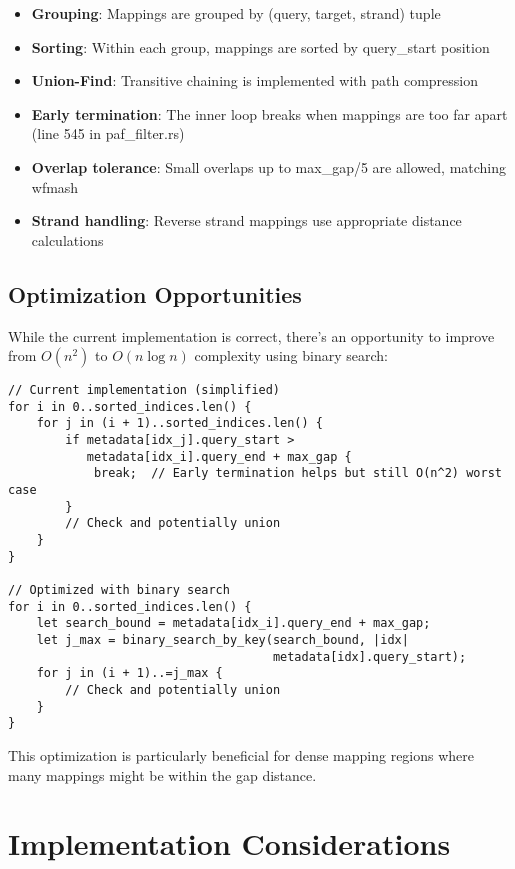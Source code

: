 \documentclass[11pt]{article}
\begin{document}
\begin{itemize}
    \item \textbf{Grouping}: Mappings are grouped by (query, target, strand) tuple
    \item \textbf{Sorting}: Within each group, mappings are sorted by query\_start position
    \item \textbf{Union-Find}: Transitive chaining is implemented with path compression
    \item \textbf{Early termination}: The inner loop breaks when mappings are too far apart (line 545 in paf\_filter.rs)
    \item \textbf{Overlap tolerance}: Small overlaps up to max\_gap/5 are allowed, matching wfmash
    \item \textbf{Strand handling}: Reverse strand mappings use appropriate distance calculations
\end{itemize}

\subsection{Optimization Opportunities}

While the current implementation is correct, there's an opportunity to improve from $O(n^2)$ to $O(n \log n)$ complexity using binary search:

\begin{verbatim}
// Current implementation (simplified)
for i in 0..sorted_indices.len() {
    for j in (i + 1)..sorted_indices.len() {
        if metadata[idx_j].query_start >
           metadata[idx_i].query_end + max_gap {
            break;  // Early termination helps but still O(n^2) worst case
        }
        // Check and potentially union
    }
}

// Optimized with binary search
for i in 0..sorted_indices.len() {
    let search_bound = metadata[idx_i].query_end + max_gap;
    let j_max = binary_search_by_key(search_bound, |idx|
                                     metadata[idx].query_start);
    for j in (i + 1)..=j_max {
        // Check and potentially union
    }
}
\end{verbatim}

This optimization is particularly beneficial for dense mapping regions where many mappings might be within the gap distance.

\section{Implementation Considerations}
\end{document}

